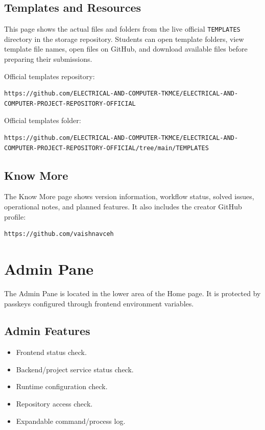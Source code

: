 \documentclass[12pt,a4paper]{article}
\begin{document}
\subsection{Templates and Resources}

This page shows the actual files and folders from the live official \texttt{TEMPLATES} directory in the storage repository. Students can open template folders, view template file names, open files on GitHub, and download available files before preparing their submissions.

Official templates repository:

\begin{lstlisting}
https://github.com/ELECTRICAL-AND-COMPUTER-TKMCE/ELECTRICAL-AND-COMPUTER-PROJECT-REPOSITORY-OFFICIAL
\end{lstlisting}

Official templates folder:

\begin{lstlisting}
https://github.com/ELECTRICAL-AND-COMPUTER-TKMCE/ELECTRICAL-AND-COMPUTER-PROJECT-REPOSITORY-OFFICIAL/tree/main/TEMPLATES
\end{lstlisting}

\subsection{Know More}

The Know More page shows version information, workflow status, solved issues, operational notes, and planned features.
It also includes the creator GitHub profile:

\begin{lstlisting}
https://github.com/vaishnavceh
\end{lstlisting}

\section{Admin Pane}

The Admin Pane is located in the lower area of the Home page. It is protected by passkeys configured through frontend environment variables.

\subsection{Admin Features}

\begin{itemize}[leftmargin=*]
    \item Frontend status check.
    \item Backend/project service status check.
    \item Runtime configuration check.
    \item Repository access check.
    \item Expandable command/process log.
\end{itemize}
\end{document}
